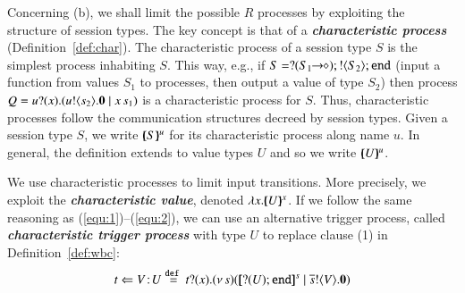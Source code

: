 
Concerning (b), we shall limit the possible $R$ processes by
exploiting the structure of session types.
The key concept is that of a {\bf \emph{characteristic process}} 
(Definition~\ref{def:char}). 
The characteristic process of 
a session type $S$ is the 
simplest process inhabiting $S$. 
This way, e.g., if $S = ? (S_1\!\! \rightarrow\!\! \diamond) ; ! \langle S_2 \rangle ; \mathtt{end}$
(input a function from values $S_1$ to processes, then output a value of type $S_2$)
then process $Q = u ? (x) . (u ! \langle s_2 \rangle . \mathbf{0} \;|\; x\, {s_1})$
is a characteristic process for $S$.
Thus, characteristic processes follow the communication structures decreed by session types.
Given a session type $S$, we write $[\!\!(S)\!\!]^{u} $ for its characteristic process along name $u$.
In general, 
the definition
extends to  value types $U$ and so we write $[\!\!(U)\!\!]^{u}$.

We use characteristic processes to limit input transitions.
More precisely, we exploit  the
{\bf\em characteristic value}, denoted $\lambda x.[\!\!(U)\!\!]^{x}$. %
If we follow the same reasoning as (\ref{equ:1})--(\ref{equ:2}), 
we can use an alternative trigger process, called
{\bf\em characteristic trigger process} with type 
$U$ to replace clause (1) in Definition~\ref{def:wbc}:
\begin{equation}
	\label{eq:4}
	\ftrigger{t}{V}{U} \defeq \fotrigger{t}{x}{s}{\btinp{U} \tinact}{V}
\end{equation}

